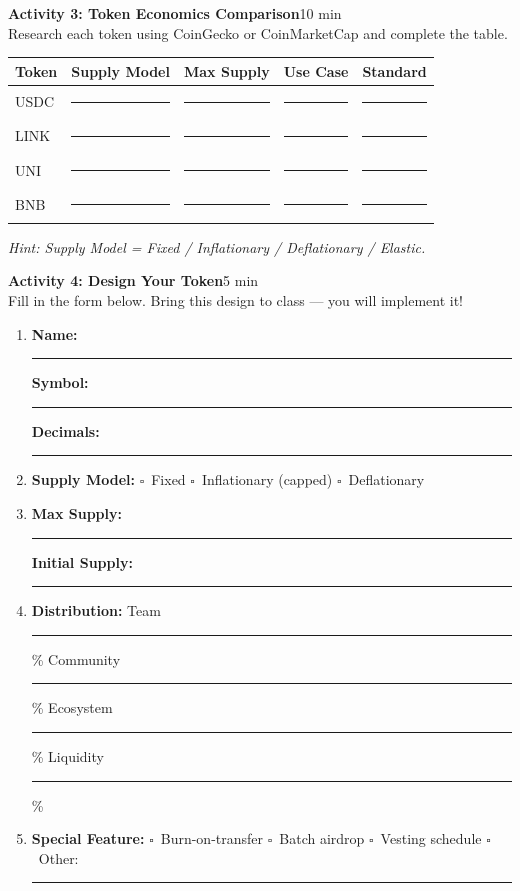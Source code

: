\documentclass[11pt,a4paper]{article}
\newcommand{\activitybox}[3]{%
  \noindent\colorbox{mllavender4}{\parbox{\dimexpr\linewidth-2\fboxsep}{%
    \textbf{\color{mlpurple}#1}\hfill\textcolor{mlgray}{\small #2}\\[2pt]#3%
  }}\par\vspace{4pt}%
}
\newcommand{\fillcell}{\rule{2.2cm}{0.3pt}}
\begin{document}
\vspace{2pt}

\activitybox{Activity 3: Token Economics Comparison}{10 min}{%
Research each token using CoinGecko or CoinMarketCap and complete the table.
\begin{center}
\renewcommand{\arraystretch}{1.35}
\begin{tabular}{@{}lcccc@{}}
\toprule
\textbf{Token} & \textbf{Supply Model} & \textbf{Max Supply} & \textbf{Use Case} & \textbf{Standard} \\
\midrule
USDC & \fillcell & \fillcell & \fillcell & \fillcell \\
LINK & \fillcell & \fillcell & \fillcell & \fillcell \\
UNI  & \fillcell & \fillcell & \fillcell & \fillcell \\
BNB  & \fillcell & \fillcell & \fillcell & \fillcell \\
\bottomrule
\end{tabular}
\end{center}
\textit{Hint: Supply Model = Fixed / Inflationary / Deflationary / Elastic.}
}

\vspace{2pt}

\activitybox{Activity 4: Design Your Token}{5 min}{%
Fill in the form below. Bring this design to class --- you will implement it!
\begin{enumerate}
\item \textbf{Name:}~\rule{3.5cm}{0.3pt}\quad \textbf{Symbol:}~\rule{2.2cm}{0.3pt}\quad \textbf{Decimals:}~\rule{1.4cm}{0.3pt}
\item \textbf{Supply Model:}\quad
      $\square$~Fixed\quad
      $\square$~Inflationary (capped)\quad
      $\square$~Deflationary
\item \textbf{Max Supply:}~\rule{3cm}{0.3pt}\quad \textbf{Initial Supply:}~\rule{3cm}{0.3pt}
\item \textbf{Distribution:}\quad
      Team~\rule{0.9cm}{0.3pt}\%\quad
      Community~\rule{0.9cm}{0.3pt}\%\quad
      Ecosystem~\rule{0.9cm}{0.3pt}\%\quad
      Liquidity~\rule{0.9cm}{0.3pt}\%
\item \textbf{Special Feature:}\quad
      $\square$~Burn-on-transfer\quad
      $\square$~Batch airdrop\quad
      $\square$~Vesting schedule\quad
      $\square$~Other:~\rule{2.5cm}{0.3pt}
\end{enumerate}
}
\end{document}
